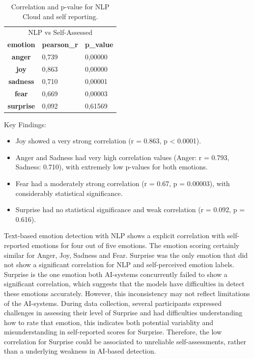 \begin{table}[!h]
    \centering
    \begin{tabular}{cll}
    \multicolumn{3}{c}{\cellcolor[HTML]{C0C0C0}NLP vs Self-Assessed}                                                         \\
    \multicolumn{1}{c|}{\textbf{emotion}}  & \multicolumn{1}{c}{\textbf{pearson\_r}} & \multicolumn{1}{c}{\textbf{p\_value}} \\ \hline
    \multicolumn{1}{c|}{\textbf{anger}}    & 0,739                                   & 0,00000                               \\
    \multicolumn{1}{c|}{\textbf{joy}}      & 0,863                                   & 0,00000                               \\
    \multicolumn{1}{c|}{\textbf{sadness}}  & 0,710                                   & 0,00001                               \\
    \multicolumn{1}{c|}{\textbf{fear}}     & 0,669                                   & 0,00003                               \\
    \multicolumn{1}{c|}{\textbf{surprise}} & 0,092                                   & 0,61569                              
    \end{tabular}
    \caption{Correlation and p-value for NLP Cloud and self reporting.}
    \label{tab:corr-nlp-self}
\end{table}

Key Findings: 
\begin{itemize}
    \item Joy showed a very strong correlation (r = 0.863, p < 0.0001). 
    \item Anger and Sadness had very high correlation values (Anger: r = 0.793, Sadness: 0.710), with extremely low p-values for both emotions. 
    \item Fear had a moderately strong correlation (r = 0.67, p = 0.00003), with considerably statistical significance. 
    \item Surprise had no statistical significance and weak correlation (r = 0.092, p = 0.616). 
\end{itemize}
Text-based emotion detection with NLP shows a explicit correlation with self-reported emotions for four out of five emotions. The emotion scoring certainly similar for Anger, Joy, Sadness and Fear. 
Surprise was the only emotion that did not show a significant correlation for NLP and self-perceived emotion labels. Surprise is the one emotion both AI-systems concurrently failed to show a significant correlation, 
which suggests that the models have difficulties in detect these emotions accurately. However, this inconsistency may not reflect limitations of the 
AI-systems. During data collection, several participants expressed challenges in assessing their level of Surprise and had difficulties understanding how to rate that emotion, 
this indicates both potential variablity and misunderstanding in self-reported scores for Surprise. 
Therefore, the low correlation for Surprise could be associated to unreliable self-assessments, rather than a underlying weakness in AI-based detection. 


